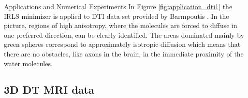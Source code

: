 \begin{chapter}{Applications and Numerical Experiments}
In Figure \ref{fig:application_dti1} the IRLS minimizer is applied to DTI data set provided by Barmpoutis \cite{barmpoutis}.
In the picture, regions of high anisotropy, where the molecules are forced to diffuse in one preferred direction, can be clearly identified.
The areas dominated mainly by green spheres correspond to approximately isotropic diffusion which means that there are no obstacles, like axons in the brain, in the 
immediate proximity of the water molecules.\\


\FloatBarrier
\subsection{3D DT MRI data} %
\label{sub:3DDTMRIdata}


\end{chapter}
